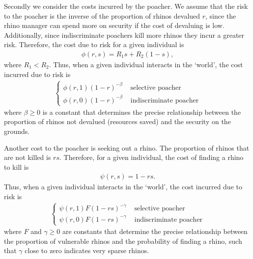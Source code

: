 \documentclass[10pt]{article}
\begin{document}
Secondly we consider the costs incurred by the poacher. We assume that the risk to the poacher is the inverse of the proportion of rhinos devalued $r$, since the rhino manager can spend more on security if the cost of devaluing is low. Additionally, since indiscriminate poachers kill more rhinos they incur a greater risk. Therefore, the cost due to risk for a given individual is
\begin{eqnarray}
\label{eqn:phi}
\phi(r,s) = R_1 s + R_2 (1-s),
\end{eqnarray}
where $R_1 < R_2$. Thus, when a given individual interacts in the `world', the cost incurred due to risk is
\begin{eqnarray}
\label{eqn:loss_risk}
\left\{
\begin{array}{cl}
\phi(r,1) (1-r)^{-\beta} & \mbox{ selective poacher}
\\
\phi(r,0) (1-r)^{-\beta} & \mbox{ indiscriminate poacher}
\end{array} \right.
\end{eqnarray}
where $\beta \geq 0$ is a constant that determines the precise relationship between the proportion of rhinos not devalued (resources saved) and the security on the grounds.

Another cost to the poacher is seeking out a rhino. The proportion of rhinos that are not killed is $rs$. Therefore, for a given individual, the cost of finding a rhino to kill is
\begin{eqnarray}
\label{eqn:psi}
\psi(r,s) = 1-rs.
\end{eqnarray}
Thus, when a given individual interacts in the `world', the cost incurred due to risk is
\begin{eqnarray}
\label{eqn:loss_finding}
\left\{
\begin{array}{cl}
\psi(r,1) F(1-rs)^{-\gamma} & \mbox{ selective poacher}
\\
\psi(r,0) F(1-rs)^{-\gamma} & \mbox{ indiscriminate poacher}
\end{array} \right.
\end{eqnarray}
where $F$ and $\gamma \geq 0$ are constants that determine the precise relationship between the proportion of vulnerable rhinos and the probability of finding a rhino, such that $\gamma$ close to zero indicates very sparse rhinos.
\end{document}
